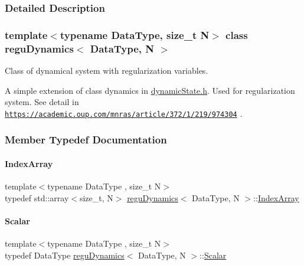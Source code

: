 \subsubsection{Detailed Description}
\subsubsection*{template$<$typename Data\+Type, size\+\_\+t N$>$\newline
class regu\+Dynamics$<$ Data\+Type, N $>$}

Class of dynamical system with regularization variables. 

A simple extension of class dynamics in \mbox{\hyperlink{dynamic_state_8h}{dynamic\+State.\+h}}. Used for regularization system. See detail in \href{https://academic.oup.com/mnras/article/372/1/219/974304}{\tt https\+://academic.\+oup.\+com/mnras/article/372/1/219/974304} . 

\subsubsection{Member Typedef Documentation}
\mbox{\label{classregu_dynamics_a2c9fa7372e4a11be9d85728b4a0e455f}} 
\paragraph{\texorpdfstring{Index\+Array}{IndexArray}}
{\footnotesize\ttfamily template$<$typename Data\+Type , size\+\_\+t N$>$ \\
typedef std\+::array$<$size\+\_\+t, N$>$ \mbox{\hyperlink{classregu_dynamics}{regu\+Dynamics}}$<$ Data\+Type, N $>$\+::\mbox{\hyperlink{classregu_dynamics_a2c9fa7372e4a11be9d85728b4a0e455f}{Index\+Array}}}

\mbox{\label{classregu_dynamics_a359c55370b4dee032396f0df86ad5fab}} 
\paragraph{\texorpdfstring{Scalar}{Scalar}}
{\footnotesize\ttfamily template$<$typename Data\+Type , size\+\_\+t N$>$ \\
typedef Data\+Type \mbox{\hyperlink{classregu_dynamics}{regu\+Dynamics}}$<$ Data\+Type, N $>$\+::\mbox{\hyperlink{classregu_dynamics_a359c55370b4dee032396f0df86ad5fab}{Scalar}}}

